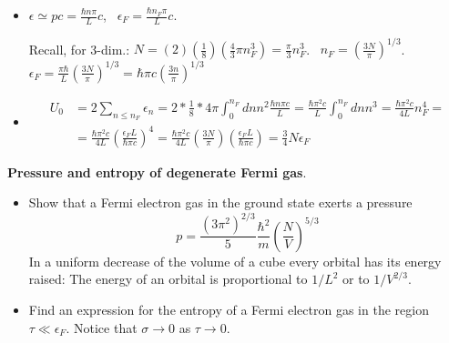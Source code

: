 \begin{itemize}
\item[(a)] $\epsilon \simeq pc = \frac{ \hbar n \pi}{L} c$, \quad \, $\epsilon_F = \frac{ \hbar n_F \pi}{L} c$.  

Recall, for 3-dim.: $N = (2) \left( \frac{1}{8} \right) \left( \frac{4}{3} \pi n_F^3 \right) = \frac{\pi}{3} n_F^3$.  \quad \, $n_F = \left( \frac{ 3N }{\pi} \right)^{1/3}$.  \\

$\epsilon_F = \frac{\pi \hbar}{L} \left( \frac{3N}{\pi} \right)^{1/3} = \hbar \pi c \left( \frac{3n}{\pi} \right)^{1/3}$
\item[(b)] 
\[
\begin{aligned}
  U_0 & = 2 \sum_{n\leq n_F} \epsilon_n = 2 * \frac{1}{8} * 4\pi \int_0^{n_F} dn n^2 \frac{ \hbar n \pi c}{L} = \frac{\hbar \pi^2 c}{L} \int_0^{n_F} dn n^3 = \frac{ \hbar \pi^2 c}{4 L} n_F^4 = \\
  & = \frac{\hbar \pi^2 c}{ 4L} \left( \frac{ \epsilon_F L }{ \hbar \pi c } \right)^4 = \frac{ \hbar \pi^2 c}{ 4L} \left( \frac{ 3N}{ \pi} \right) \left( \frac{ \epsilon_F L}{ \hbar \pi c} \right) = \boxed{ \frac{3}{4} N \epsilon_F }
\end{aligned}
\]
\end{itemize}
 \textbf{Pressure and entropy of degenerate Fermi gas}.  \begin{itemize} \item[(a)] Show that a Fermi electron gas in the ground state exerts a pressure
\begin{equation}
  p = \frac{(3\pi^2 )^{2/3} }{5} \frac{ \hbar^2}{m} \left( \frac{N}{V} \right)^{5/3}
\end{equation}
In a uniform decrease of the volume of a cube every orbital has its energy raised: The energy of an orbital is proportional to $1/L^2$ or to $1/V^{2/3}$.  \item[(b)] Find an expression for the entropy of a Fermi electron gas in the region $\tau \ll \epsilon_F$.  Notice that $\sigma \to 0$ as $\tau \to 0$.  \end{itemize}


